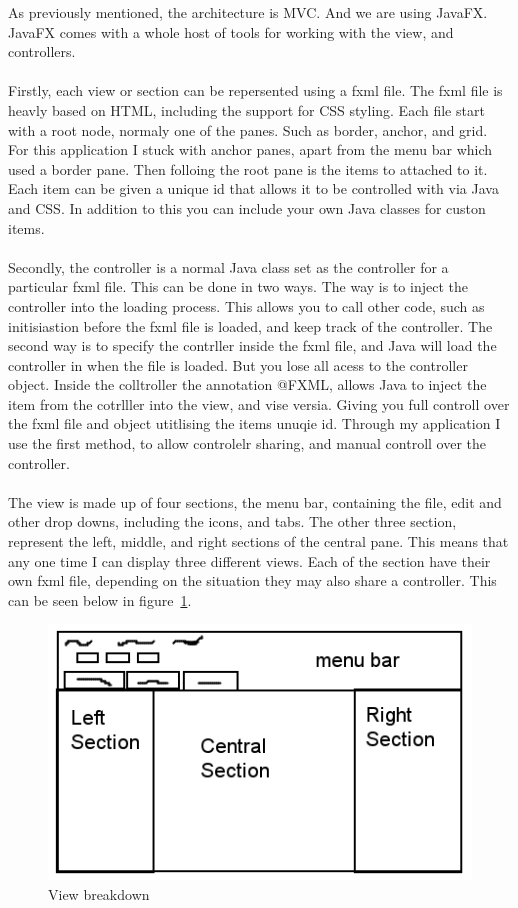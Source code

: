 As previously mentioned, the architecture is MVC. And we are using JavaFX. JavaFX comes with a whole host of tools for working with the view, and controllers. 
\\\\
Firstly, each view or section can be repersented using a fxml file. The fxml file is heavly based on HTML, including the support for CSS styling. Each file start with a root node, normaly one of the panes. Such as border, anchor, and grid. For this application I stuck with anchor panes, apart from the menu bar which used a border pane. Then folloing the root pane is the items to attached to it. Each item can be given a unique id that allows it to be controlled with via Java and CSS. In addition to this you can include your own Java classes for custon items.
\\\\
Secondly, the controller is a normal Java class set as the controller for a particular fxml file. This can be done in two ways. The way is to inject the controller into the loading process. This allows you to call other code, such as initisiastion before the fxml file is loaded, and keep track of the controller. The second way is to specify the contrller inside the fxml file, and Java will load the controller in when the file is loaded. But you lose all acess to the controller object. Inside the colltroller the annotation @FXML, allows Java to inject the item from the cotrlller into the view, and vise versia. Giving you full controll over the fxml file and object utitlising the items unuqie id. Through my application I use the first method, to allow controlelr sharing, and manual controll over the controller. 
\\\\
The view is made up of four sections, the menu bar, containing the file, edit and other drop downs, including the icons, and tabs. The other three section, represent the left, middle, and right sections of the central pane. This means that any one time I can display three different views. Each of the section have their own fxml file, depending on the situation they may also share a controller. This can be seen below in figure~\ref{fig:view_breakdown}.

\begin{figure}[H]
	\centering
	\includegraphics[scale=0.5]{images/view_breakdown.png}
	\caption{View breakdown}
	\label{fig:view_breakdown}
\end{figure}


